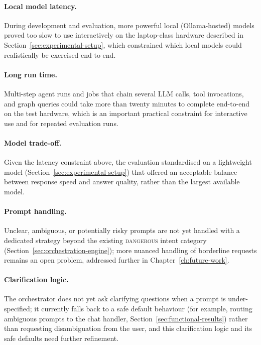 \documentclass[a4paper,noexaminfo]{sapthesis}
\begin{document}
\paragraph{Local model latency.}
During development and evaluation, more powerful local (Ollama-hosted)
models proved too slow to use interactively on the laptop-class hardware
described in Section~\ref{sec:experimental-setup}, which constrained
which local models could realistically be exercised end-to-end.

\paragraph{Long run time.}
Multi-step agent runs and jobs that chain several LLM calls, tool
invocations, and graph queries could take more than twenty minutes to
complete end-to-end on the test hardware, which is an important
practical constraint for interactive use and for repeated evaluation
runs.

\paragraph{Model trade-off.}
Given the latency constraint above, the evaluation standardised on a
lightweight model (Section~\ref{sec:experimental-setup}) that offered an
acceptable balance between response speed and answer quality, rather
than the largest available model.

\paragraph{Prompt handling.}
Unclear, ambiguous, or potentially risky prompts are not yet handled with
a dedicated strategy beyond the existing \textsc{dangerous} intent
category (Section~\ref{sec:orchestration-engine}); more nuanced handling
of borderline requests remains an open problem, addressed further in
Chapter~\ref{ch:future-work}.

\paragraph{Clarification logic.}
The orchestrator does not yet ask clarifying questions when a prompt is
under-specified; it currently falls back to a safe default behaviour
(for example, routing ambiguous prompts to the chat handler,
Section~\ref{sec:functional-results}) rather than requesting
disambiguation from the user, and this clarification logic and its safe
defaults need further refinement.
\end{document}
